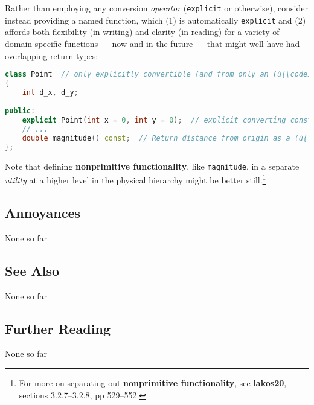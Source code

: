 Rather than employing any conversion \emph{operator} (\texttt{explicit}
or otherwise), consider instead providing a named function, which (1) is
automatically \texttt{explicit} and (2) affords both flexibility (in
writing) and clarity (in reading) for a variety of domain-specific
functions --- now and in the future --- that might well have had
overlapping return types:

\begin{lstlisting}[language=C++]
class Point  // only explicitly convertible (and from only an (ù{\codeincomments{int}}ù))
{
    int d_x, d_y;

public:
    explicit Point(int x = 0, int y = 0);  // explicit converting constructor
    // ...
    double magnitude() const;  // Return distance from origin as a (ù{\codeincomments{double}}ù).
};
\end{lstlisting}

\noindent Note that defining \textbf{nonprimitive functionality}, like
\texttt{magnitude}, in a separate \emph{utility} at a higher level in the
physical hierarchy might be better still.{\cprotect\footnote{For more on
separating out \textbf{nonprimitive functionality}, see
  \textbf{{lakos20}}, sections 3.2.7--3.2.8, pp 529--552.}}

\subsection[Annoyances]{Annoyances}\label{annoyances}

None so far

\subsection[See Also]{See Also}\label{see-also}

None so far

\subsection[Further Reading]{Further Reading}\label{further-reading}

None so far

